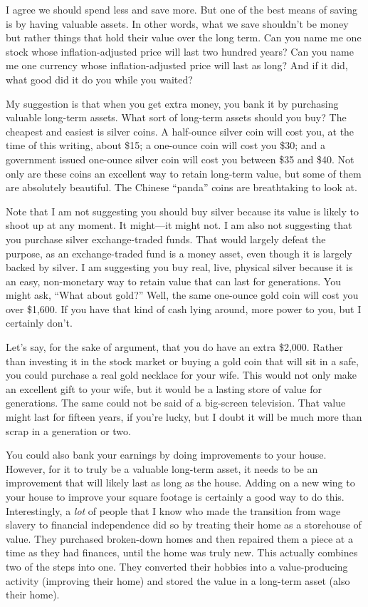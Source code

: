 I agree we should spend less and save more. But one of the best means of
saving is by having valuable assets. In other words, what we save
shouldn’t be money but rather things that hold their value over the
long term. Can you name me one stock whose inflation-adjusted price
will last two hundred years?  Can you name me one currency whose
inflation-adjusted price will last as long?  And if it did, what good
did it do you while you waited?

My suggestion is that when you get extra money, you bank it by
purchasing valuable long-term assets. What sort of long-term assets
should you buy? The cheapest and easiest is silver coins. A half-ounce
silver coin will cost you, at the time of this writing, about \$15; a
one-ounce coin will cost you \$30; and a government issued one-ounce
silver coin will cost you between \$35 and \$40. Not only are these
coins an excellent way to retain long-term value, but some of them are
absolutely beautiful. The Chinese “panda” coins are breathtaking to
look at.

Note that I am not suggesting you should buy silver because its value is
likely to shoot up at any moment. It might—it might not. I am also not
suggesting that you purchase silver exchange-traded funds. That would
largely defeat the purpose, as an exchange-traded fund is a money
asset, even though it is largely backed by silver. I am suggesting you
buy real, live, physical silver because it is an easy, non-monetary way
to retain value that can last for generations. You might ask, “What
about gold?”  Well, the same one-ounce gold coin will cost you over
\$1,600. If you have that kind of cash lying around, more power to you,
but I certainly don’t. 

Let’s say, for the sake of argument, that you do have an extra \$2,000.
Rather than investing it in the stock market or buying a gold coin that
will sit in a safe, you could purchase a real gold necklace for your
wife. This would not only make an excellent gift to your wife, but it
would be a lasting store of value for generations. The same could not
be said of a big-screen television. That value might last for fifteen
years, if you’re lucky, but I doubt it will be much more than scrap in
a generation or two. 

You could also bank your earnings by doing improvements to your house.
However, for it to truly be a valuable long-term asset, it needs to be
an improvement that will likely last as long as the house. Adding on a
new wing to your house to improve your square footage is certainly a
good way to do this. Interestingly, a \textit{lot} of people that I
know who made the transition from wage slavery to financial
independence did so by treating their home as a storehouse of value.
They purchased broken-down homes and then repaired them a piece at a
time as they had finances, until the home was truly new. This actually
combines two of the steps into one. They converted their hobbies into a
value-producing activity (improving their home) and stored the value in
a long-term asset (also their home). 

